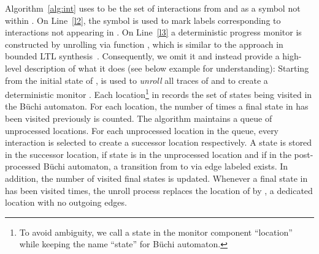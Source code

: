 Algorithm~\ref{alg:int} uses  to
be the set of interactions from  and  as a symbol
not within . 
On Line~\ref{l2}, the symbol  is used to mark labels corresponding
to interactions  not appearing in . On Line~\ref{l3} a
deterministic progress monitor is constructed  by unrolling
 via function , which is similar to the
approach in bounded LTL synthesis~\cite{ScheweF07a}. Consequently, we
omit it and instead provide a high-level description of what it does (see below example for understanding):
Starting from the initial state of ,
 is used to \emph{unroll} all traces
of  and to create a deterministic
monitor . Each location\footnote{To avoid
  ambiguity, we call a state in the monitor component ``location''
  while keeping the name ``state'' for B\"uchi automaton.}  in
 records the set of states being visited in the
B\"uchi automaton. For each location, the number of times a final state
in  has been visited previously is counted.
The algorithm maintains a queue of unprocessed locations. For each
unprocessed location in the queue, every interaction  is selected to create a successor
location respectively. A state  is stored in the successor
location, if state  is in the unprocessed location and if in the
post-processed B\"uchi automaton, a transition from  to  via
edge labeled  exists. In addition, the number of visited final
states is updated. Whenever a final state in
 has been visited  times, the unroll
process replaces the location of  by
, a dedicated location with no outgoing edges. 

